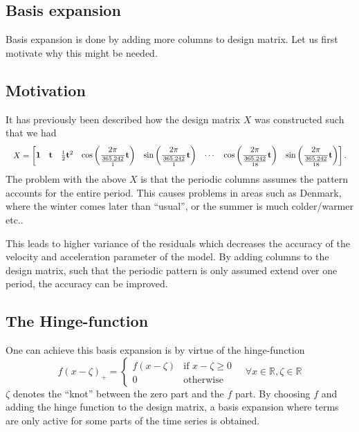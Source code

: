 \subsection{Basis expansion}

Basis expansion is done by adding more columns to design matrix. Let us first motivate why this might be needed.

\subsection{Motivation}
It has previously been described how the design matrix $X$ was constructed such that we had 
\begin{equation*}
\resizebox{\textwidth}{!}{$
X = \left[\begin{matrix}
	\mathbf{1} &
	\mathbf{t} &
	\frac{1}{2} \mathbf{t}^2 &
	\cos\left( \dfrac{2 \pi}{\frac{365.242}{1}} \mathbf{t} \right) &
	\sin\left( \dfrac{2 \pi}{\frac{365.242}{1}} \mathbf{t} \right) &
	\cdots &
	\cos\left( \dfrac{2 \pi}{\frac{365.242}{18}} \mathbf{t} \right) &
	\sin\left( \dfrac{2 \pi}{\frac{365.242}{18}} \mathbf{t} \right)
\end{matrix}\right].
$}
\end{equation*}
The problem with the above $X$ is that the periodic columns assumes the pattern accounts for the entire period. This causes problems in areas such as Denmark, where the winter comes later than ``usual'', or the summer is much colder/warmer etc..

This leads to higher variance of the residuals which decreases the accuracy of the velocity and acceleration parameter of the model. By adding columns to the design matrix, such that the periodic pattern is only assumed extend over one period, the accuracy can be improved.

\subsection{The Hinge-function}

One can achieve this basis expansion is by virtue of the hinge-function
\begin{equation}
f(x - \zeta)_+ = \begin{cases}
  f(x - \zeta) & \text{if } x - \zeta \ge 0 \\
  0                 & \text{otherwise}
\end{cases} \quad \forall x \in \mathbb{R}, \zeta \in \mathbb{R}
\end{equation}
$\zeta$ denotes the ``knot'' between the zero part and the $f$ part. By choosing $f$ and adding the hinge function to the design matrix, a basis expansion where terms are only active for some parts of the time series is obtained.

